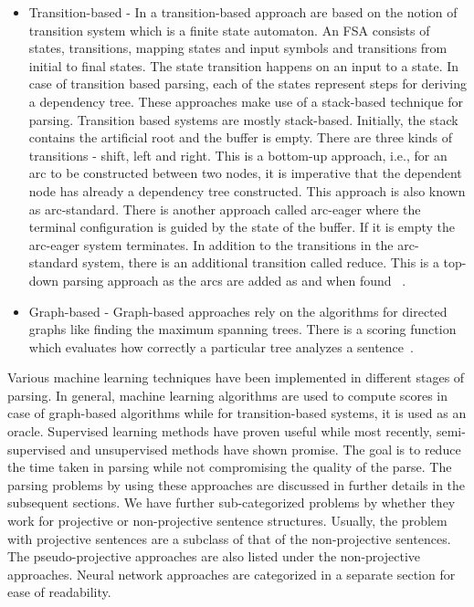 \begin{itemize}
    \item{Transition-based - }{In a transition-based approach are based on the notion of transition system which is a finite state automaton. An FSA consists of states, transitions, mapping states and input symbols and transitions from initial to final states. The state transition happens on an input to a state. In case of transition based parsing, each of the states represent steps for deriving a dependency tree. These approaches make use of a stack-based technique for parsing. Transition based systems are mostly stack-based. Initially, the stack contains the artificial root and the buffer is empty. There are three kinds of transitions - shift, left and right. This is a bottom-up approach, i.e., for an arc to be constructed between two nodes, it is imperative that the dependent node has already a dependency tree constructed. This approach is also known as arc-standard. There is another approach called arc-eager where the terminal configuration is guided by the state of the buffer. If it is empty the arc-eager system terminates. In addition to the transitions in the arc-standard system, there is an additional transition called reduce. This is a top-down parsing approach as the arcs are added as and when found~ \cite{kubler2009dependency}.
    }
    \item{Graph-based - }{Graph-based approaches rely on the algorithms for directed graphs like finding the maximum spanning trees. There is a scoring function which evaluates how correctly a particular tree analyzes a sentence~\cite{kubler2009dependency}. }
\end{itemize}
 
Various machine learning techniques have been implemented in different stages of parsing. In general, machine learning algorithms are used to compute scores in case of graph-based algorithms while for transition-based systems, it is used as an oracle. Supervised learning methods have proven useful while most recently, semi-supervised and unsupervised methods have shown promise. The goal is to reduce the time taken in parsing while not compromising the quality of the parse. 
The parsing problems by using these approaches are discussed in further details in the subsequent sections. We have further sub-categorized problems by whether they work for projective or non-projective sentence structures. Usually, the problem with projective sentences are a subclass of that of the non-projective sentences. The pseudo-projective approaches are also listed under the non-projective approaches. Neural network approaches are categorized in a separate section for ease of readability.

